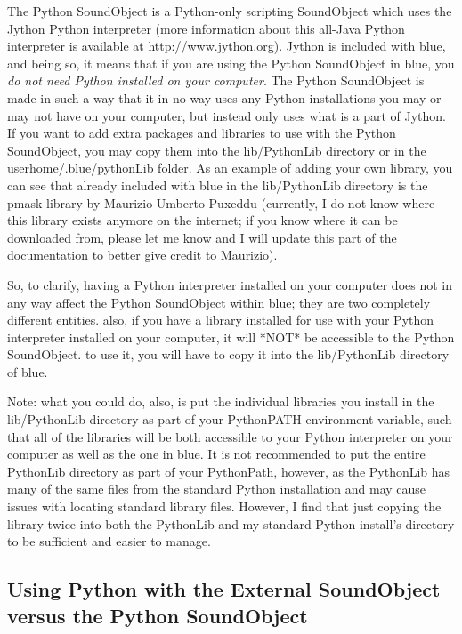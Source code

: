 The Python SoundObject is a Python-only scripting SoundObject which uses
the Jython Python interpreter (more information about this all-Java
Python interpreter is available at http://www.jython.org). Jython is
included with blue, and being so, it means that if you are using the
Python SoundObject in blue, you \emph{do not need Python installed on
your computer}. The Python SoundObject is made in such a way that it in
no way uses any Python installations you may or may not have on your
computer, but instead only uses what is a part of Jython. If you want to
add extra packages and libraries to use with the Python SoundObject, you
may copy them into the lib/PythonLib directory or in the
userhome/.blue/pythonLib folder. As an example of adding your own
library, you can see that already included with blue in the
lib/PythonLib directory is the pmask library by Maurizio Umberto Puxeddu
(currently, I do not know where this library exists anymore on the
internet; if you know where it can be downloaded from, please let me
know and I will update this part of the documentation to better give
credit to Maurizio).

So, to clarify, having a Python interpreter installed on your computer
does not in any way affect the Python SoundObject within blue; they are
two completely different entities. also, if you have a library installed
for use with your Python interpreter installed on your computer, it will
*NOT* be accessible to the Python SoundObject. to use it, you will have
to copy it into the lib/PythonLib directory of blue.

Note: what you could do, also, is put the individual libraries you
install in the lib/PythonLib directory as part of your PythonPATH
environment variable, such that all of the libraries will be both
accessible to your Python interpreter on your computer as well as the
one in blue. It is not recommended to put the entire PythonLib directory
as part of your PythonPath, however, as the PythonLib has many of the
same files from the standard Python installation and may cause issues
with locating standard library files. However, I find that just copying
the library twice into both the PythonLib and my standard Python
install's directory to be sufficient and easier to manage.

\subsection{Using Python with the External SoundObject versus the Python
SoundObject}

